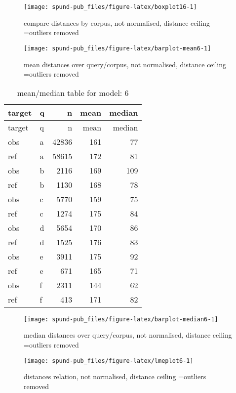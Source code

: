 \documentclass[
  12pt,
  oneside]{book}
\begin{document}
\begin{figure}[H]
\texttt{[image: spund-pub\_files/figure-latex/boxplot16-1]} \caption{compare distances by corpus, not normalised, distance ceiling =outliers removed}\label{fig:boxplot16}
\end{figure}

\begin{figure}[H]
\texttt{[image: spund-pub\_files/figure-latex/barplot-mean6-1]} \caption{mean distances over query/corpus, not normalised, distance ceiling =outliers removed}\label{fig:barplot-mean6}
\end{figure}

\begin{longtable}[]{@{}llrrr@{}}
\caption{\label{tab:dfe-table6}mean/median table for model: 6}\tabularnewline
\toprule\noalign{}
target & q & n & mean & median \\
\midrule\noalign{}
\endfirsthead
\toprule\noalign{}
target & q & n & mean & median \\
\midrule\noalign{}
\endhead
\bottomrule\noalign{}
\endlastfoot
obs & a & 42836 & 161 & 77 \\
ref & a & 58615 & 172 & 81 \\
obs & b & 2116 & 169 & 109 \\
ref & b & 1130 & 168 & 78 \\
obs & c & 5770 & 159 & 75 \\
ref & c & 1274 & 175 & 84 \\
obs & d & 5654 & 170 & 86 \\
ref & d & 1525 & 176 & 83 \\
obs & e & 3911 & 175 & 92 \\
ref & e & 671 & 165 & 71 \\
obs & f & 2311 & 144 & 62 \\
ref & f & 413 & 171 & 82 \\
\end{longtable}

\begin{figure}[H]
\texttt{[image: spund-pub\_files/figure-latex/barplot-median6-1]} \caption{median distances over query/corpus, not normalised, distance ceiling =outliers removed}\label{fig:barplot-median6}
\end{figure}

\begin{figure}[H]
\texttt{[image: spund-pub\_files/figure-latex/lmeplot6-1]} \caption{distances relation, not normalised, distance ceiling =outliers removed}\label{fig:lmeplot6}
\end{figure}
\end{document}
